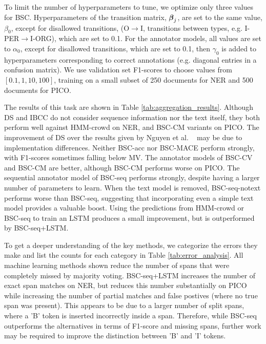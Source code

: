 To limit the number of hyperparameters to tune, we optimize only three values for BSC.
Hyperparameters of the transition matrix, $\boldsymbol\beta_j$, are set to the same value, 
$\beta_0$, except for disallowed transitions, (O$\rightarrow$I, transitions between types, e.g. I-PER$\rightarrow$I-ORG), which are set to 0.1.  
For the annotator models,
all values are set to $\alpha_0$, except for disallowed transitions, which are set to 0.1, then $\gamma_0$ is added to hyperparameters 
corresponding to correct annotations (e.g. diagonal entries in a confusion matrix).
We use validation set F1-scores to choose values from $[0.1, 1, 10, 100]$, 
training on a small subset of 250 documents for NER and 500 documents for PICO. 

The results of this task are shown in Table \ref{tab:aggregation_results}.
Although DS and IBCC do not consider sequence information nor the text itself, 
they both perform well against HMM-crowd on NER,
and BSC-CM variants on PICO. 
The improvement of DS over the results given 
by Nguyen et al. ~ may be due to implementation differences. 
Neither BSC-acc nor BSC-MACE perform strongly, with F1-scores sometimes falling below MV. 
The annotator models of BSC-CV and BSC-CM are better, although BSC-CM performs worse on PICO.
The sequential annotator model of BSC-seq performs strongly, despite
having a larger number of parameters to learn.
When the text model is removed, BSC-seq-notext performs worse than BSC-seq,
suggesting that incorporating even a simple text model provides 
a valuable boost.
Using the predictions from HMM-crowd or BSC-seq to train an LSTM produces a small improvement, but is outperformed by BSC-seq+LSTM.

To get a deeper understanding of the key methods, we categorize the errors they make and list the
counts for each category in Table \ref{tab:error_analysis}.
All machine learning methods shown reduce the number of spans that were completely missed by majority
voting. 
BSC-seq+LSTM increases the number of exact span matches on NER, but reduces this number substantially on PICO
while increasing the number of partial matches and false postives (where no true span was present). 
This appears to be due to a larger number of split spans, where a 'B' token is inserted incorrectly inside
a span. 
Therefore, while BSC-seq outperforms the alternatives in terms of F1-score and missing spans, 
further work may be required to improve the distinction between 'B' and 'I' tokens. 

